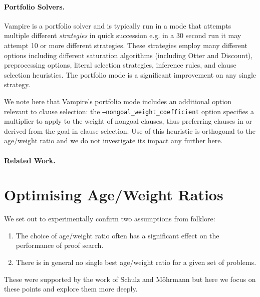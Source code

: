 \documentclass{llncs}
\newcommand{\sandm}{Schulz and M{\"{o}}hrmann}
\begin{document}
\paragraph{Portfolio Solvers.}

Vampire is a portfolio solver and is typically run in a mode that attempts multiple different \emph{strategies} in quick succession e.g. in a 30 second run it may attempt 10 or more different strategies. These strategies employ many different options including different saturation algorithms (including Otter and Discount), preprocessing options, literal selection strategies, inference rules, and clause selection heuristics. The portfolio mode is a significant improvement on any single strategy. 

We note here that Vampire's portfolio mode includes an additional option relevant to clause selection: the \texttt{--nongoal\_weight\_coefficient} option specifies a multiplier to apply to the weight of nongoal clauses, thus preferring clauses in or derived from the goal in clause selection. Use of this heuristic is orthogonal to the age/weight ratio and we do not investigate its impact any further here.

\paragraph{Related Work.} 

\section{Optimising Age/Weight Ratios} \label{sec:awr:study}

We set out to experimentally confirm two assumptions from folklore:
\begin{enumerate}
	\item The choice of age/weight ratio often has a significant effect on the performance of proof search.
	\item There is in general no single best age/weight ratio for a given set of problems.
\end{enumerate}
These were supported by the work of \sandm{} but here we focus on these points and explore them more deeply.
\end{document}
